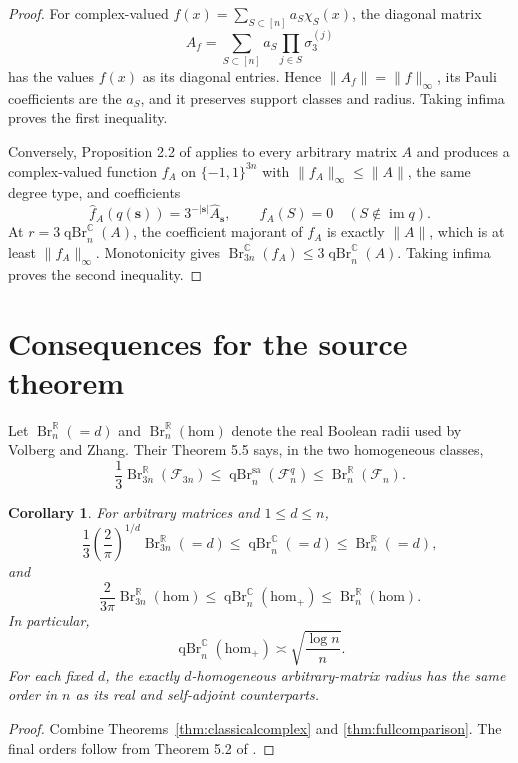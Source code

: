 \documentclass[11pt]{article}
\newtheorem{corollary}[theorem]{Corollary}
\theoremstyle{remark}
\newcommand{\C}{\mathbb C}
\newcommand{\R}{\mathbb R}
\newcommand{\qBr}{\operatorname{qBr}}
\newcommand{\Br}{\operatorname{Br}}
\newcommand{\sa}{\mathrm{sa}}
\newcommand{\homc}{\mathrm{hom}}
\begin{document}
\begin{proof}
For complex-valued
$f(x)=\sum_{S\subset[n]}a_S\chi_S(x)$, the diagonal matrix
\[
 A_f=\sum_{S\subset[n]}a_S\prod_{j\in S}\sigma_3^{(j)}
\]
has the values $f(x)$ as its diagonal entries.  Hence
$\|A_f\|=\|f\|_\infty$, its Pauli coefficients are the $a_S$, and it
preserves support classes and radius.  Taking infima proves the first
inequality.

Conversely, Proposition 2.2 of \cite{VZ} applies to every arbitrary matrix
$A$ and produces a complex-valued function $f_A$ on $\{-1,1\}^{3n}$ with
$\|f_A\|_\infty\leq\|A\|$, the same degree type, and coefficients
\[
 \widehat f_A(q(\mathbf s))=3^{-|\mathbf s|}\widehat A_{\mathbf s},
 \qquad
 \widehat f_A(S)=0\quad(S\notin\operatorname{im}q).
\]
At $r=3\qBr_n^{\C}(A)$, the coefficient majorant of $f_A$ is exactly
$\|A\|$, which is at least $\|f_A\|_\infty$.  Monotonicity gives
$\Br_{3n}^{\C}(f_A)\leq3\qBr_n^{\C}(A)$.  Taking infima proves the second
inequality.
\end{proof}

\section{Consequences for the source theorem}

Let $\Br_n^{\R}(=d)$ and $\Br_n^{\R}(\homc)$ denote the real Boolean radii
used by Volberg and Zhang.  Their Theorem 5.5 says, in the two homogeneous
classes,
\[
 \frac13\Br_{3n}^{\R}(\mathcal F_{3n})
 \leq\qBr_n^{\sa}(\mathcal F_n^q)
 \leq\Br_n^{\R}(\mathcal F_n).
\]

\begin{corollary}\label{cor:source}
For arbitrary matrices and $1\leq d\leq n$,
\begin{equation}\label{eq:sourceexact}
 \frac13\left(\frac2\pi\right)^{1/d}\Br_{3n}^{\R}(=d)
 \leq\qBr_n^{\C}(=d)
 \leq\Br_n^{\R}(=d),
\end{equation}
and
\begin{equation}\label{eq:sourcehom}
 \frac2{3\pi}\Br_{3n}^{\R}(\homc)
 \leq\qBr_n^{\C}(\homc_+)
 \leq\Br_n^{\R}(\homc).
\end{equation}
In particular,
\[
 \qBr_n^{\C}(\homc_+)\asymp\sqrt{\frac{\log n}{n}}.
\]
For each fixed $d$, the exactly $d$-homogeneous arbitrary-matrix radius has
the same order in $n$ as its real and self-adjoint counterparts.
\end{corollary}

\begin{proof}
Combine Theorems~\ref{thm:classicalcomplex} and
\ref{thm:fullcomparison}.  The final orders follow from Theorem 5.2 of
\cite{VZ}.
\end{proof}
\end{document}

